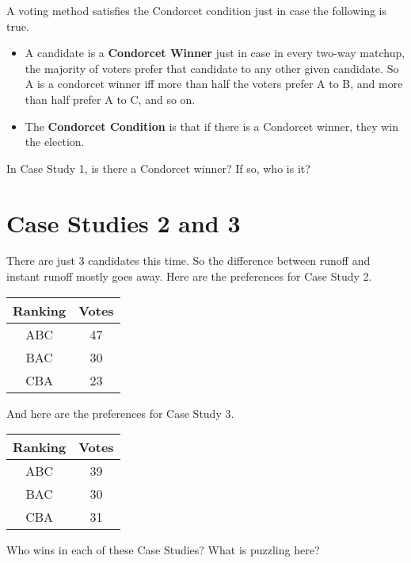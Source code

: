 A voting method satisfies the Condorcet condition just in case the following is true.

\begin{itemize}
\item{} A candidate is a \textbf{Condorcet Winner} just in case in every two-way matchup, the majority of voters prefer that candidate to any other given candidate. So A is a condorcet winner iff more than half the voters prefer A to B, and more than half prefer A to C, and so on.

\item{} The \textbf{Condorcet Condition} is that if there is a Condorcet winner, they win the election.

\end{itemize}
In Case Study 1, is there a Condorcet winner? If so, who is it?

\section{Case Studies 2 and 3}
\label{casestudies2and3}

There are just 3 candidates this time. So the difference between runoff and instant runoff mostly goes away. Here are the preferences for Case Study 2.

\begin{table}[htbp]
\begin{minipage}{\linewidth}
\setlength{\tymax}{0.5\linewidth}
\centering
\small
\begin{tabulary}{\textwidth}{@{}cc@{}} \toprule
 Ranking & Votes \\
\midrule

 ABC & 47 \\
 BAC & 30 \\
 CBA & 23 \\
\bottomrule

\end{tabulary}
\end{minipage}
\end{table}
\noindent And here are the preferences for Case Study 3.

\begin{table}[htbp]
\begin{minipage}{\linewidth}
\setlength{\tymax}{0.5\linewidth}
\centering
\small
\begin{tabulary}{\textwidth}{@{}cc@{}} \toprule
 Ranking & Votes \\
\midrule

 ABC & 39 \\
 BAC & 30 \\
 CBA & 31 \\
\bottomrule

\end{tabulary}
\end{minipage}
\end{table}
\noindent Who wins in each of these Case Studies? What is puzzling here?

